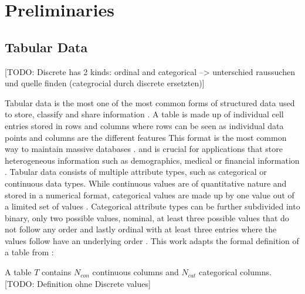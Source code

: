 \chapter{Preliminaries}
\label{ch:preliminaries}

\section{Tabular Data}
\label{ch:preliminaries-dataSynthesis-tabularData}
[TODO: Discrete has 2 kinds: ordinal and categorical --> unterschied raussuchen und quelle finden (categrocial durch discrete ersetzten)]


Tabular data is the most one of the most common forms of structured data \cite{hernandez2022SyntheticDataGeneration} used to store, classify and share information \cite{pilaluisa2022ContextualWordEmbeddings}.
A table is made up of individual cell entries stored in rows and columns where rows can be seen as individual data points and columns are the different features \cite{borisov2022DeepNeuralNetworks, yoon2020VIMEExtendingSuccess}
This format is the most common way to maintain massive databases \cite{esmaeilpour2022BidiscriminatorGANTabular, yoon2020VIMEExtendingSuccess}.
and is crucial for applications that store heterogeneous information such as demographics, medical or financial information \cite{borisov2022DeepNeuralNetworks, yoon2020VIMEExtendingSuccess}.
Tabular data consists of multiple attribute types, such as categorical or continuous data types\cite{borisov2022DeepNeuralNetworks}.
While continuous values are of quantitative nature and stored in a numerical format, categorical values are made up by one value out of a limited set of values \cite{lederrey2022DATGANIntegratingExperta, lane2003IntroductionStatistics}.
Categorical attribute types can be further subdivided into binary, only two possible values, nominal, at least three possible values that do not follow any order and lastly ordinal with at least three entries where the values follow have an underlying order \cite{lederrey2022DATGANIntegratingExperta}.
This work adapts the formal definition of a table from \cite{xu2019ModelingTabularData}:

\begin{displayquote}
A table $T$ contains $N_{con}$ continuous columns and $N_{cat}$ categorical columns. [TODO: Definition ohne Discrete values]
\end{displayquote}

